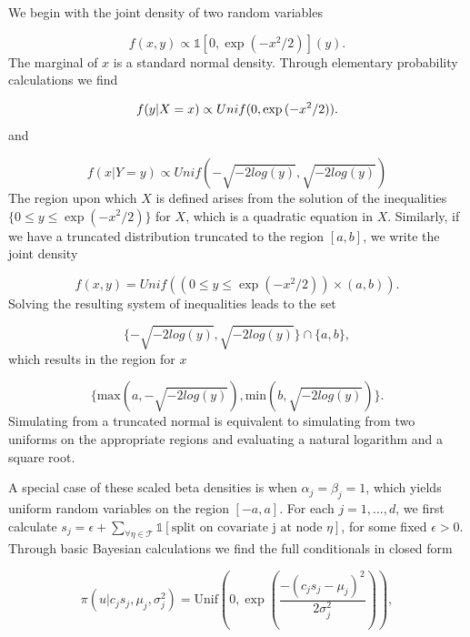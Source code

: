 We begin with the joint density of two random variables 

\begin{equation}
f(x,y) \propto \mathds{1}[0, \exp{(-x^2/2)}](y).
\end{equation}
The marginal of $x$ is a standard normal density. Through elementary probability calculations we find 

\begin{equation}\newnot{symbol:unif}
f(y\vert X=x) \propto Unif(0, \exp{(-x^2/2)}).
\end{equation}
 and 
 
 \begin{equation}
f(x\vert Y=y) \propto Unif(-\sqrt{-2log(y)}, \sqrt{-2log(y)})
\end{equation}
 The region upon which $X$ is defined arises from the solution of the inequalities $\{0\leq y \leq \exp{(-x^2/2)} \} $ for $X$, which is a quadratic equation in $X$. Similarly, if we have a truncated distribution truncated to the region $[a,b]$, we write the joint density 
 
 \begin{equation}
 f(x,y)=Unif((0\leq y\leq \exp{(-x^2/2)})\times (a,b)).
 \end{equation}
 Solving the resulting system of inequalities leads to the set 
 
 \begin{equation}
 \{-\sqrt{-2log(y)}, \sqrt{-2log(y)} \} \cap \{a, b\},
 \end{equation}
which results in the region for $x$

\begin{equation}
 \{\text{max}(a,-\sqrt{-2log(y)}), \text{min}(b,\sqrt{-2log(y)} )\} .
 \end{equation}
 Simulating from a truncated normal is equivalent to simulating from two uniforms on the appropriate regions and evaluating a natural logarithm and a square root. 
 
 A special case of these scaled beta densities is when $\alpha_j=\beta_j=1$, which yields uniform random variables on the region $[-a,a]$. 
For each $j=1, \dots, d$, we first calculate $s_j = \epsilon+\sum_{\forall \eta \in \mathcal{T}}\mathds{1}[\text{split on covariate j at node $\eta$}]$, for some fixed $\epsilon>0$.
Through basic Bayesian calculations we find the full conditionals in closed form
 
\begin{equation}\label{eqn:u_given_cjsj}
\pi(u \vert c_js_j, \mu_j, \sigma_j^2)= \text{Unif}(0, \exp{(\frac{-(c_js_j-\mu_j)^2}{2\sigma_j^2} )}),
\end{equation}

